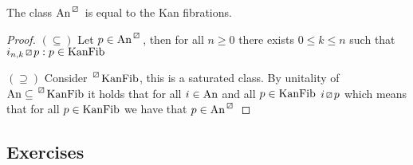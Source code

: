 \begin{prop}
    The class $\An^{\lift{}}$ is equal to the Kan fibrations.
\end{prop}

\begin{proof}
    $(\subseteq)$ Let $p \in \An^{\lift{}}$, then for all $n\geq 0$ there exists $0 \leq k \leq  n$ such that $i_{n,k} \lift{} p: p \in \KanFib$

    $(\supseteq)$ Consider $\prescript{\lift{}}{}{\KanFib}$, this is a saturated class. 
    By unitality of $\An \subseteq \prescript{\lift{}}{}{\KanFib}$ it holds that for all $i \in  \operatorname{An}$ and all $p \in \operatorname{KanFib}$ $i\lift{}p $ which means that for all $p \in \operatorname{KanFib}$ we have that $p \in \An^{\lift{}}$
\end{proof}

\subsection{Exercises}

